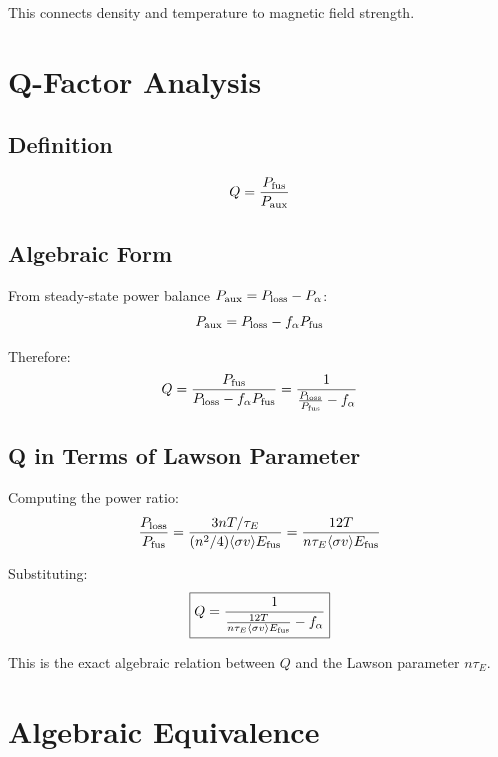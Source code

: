 \documentclass[11pt,a4paper]{article}
\begin{document}
This connects density and temperature to magnetic field strength.

\section{Q-Factor Analysis}

\subsection{Definition}

\begin{equation}
Q = \frac{P_{\rm fus}}{P_{\rm aux}}
\end{equation}

\subsection{Algebraic Form}

From steady-state power balance $P_{\rm aux} = P_{\rm loss} - P_\alpha$:
\begin{equation}
P_{\rm aux} = P_{\rm loss} - f_\alpha P_{\rm fus}
\end{equation}

Therefore:
\begin{equation}
Q = \frac{P_{\rm fus}}{P_{\rm loss} - f_\alpha P_{\rm fus}} 
  = \frac{1}{\frac{P_{\rm loss}}{P_{\rm fus}} - f_\alpha}
\end{equation}

\subsection{Q in Terms of Lawson Parameter}

Computing the power ratio:
\begin{equation}
\frac{P_{\rm loss}}{P_{\rm fus}} = \frac{3nT/\tau_E}{(n^2/4)\langle\sigma v\rangle E_{\rm fus}}
= \frac{12T}{n\tau_E \langle\sigma v\rangle E_{\rm fus}}
\end{equation}

Substituting:
\begin{equation}
\boxed{Q = \frac{1}{\frac{12T}{n\tau_E \langle\sigma v\rangle E_{\rm fus}} - f_\alpha}}
\end{equation}

This is the exact algebraic relation between $Q$ and the Lawson parameter $n\tau_E$.

\section{Algebraic Equivalence}
\end{document}
